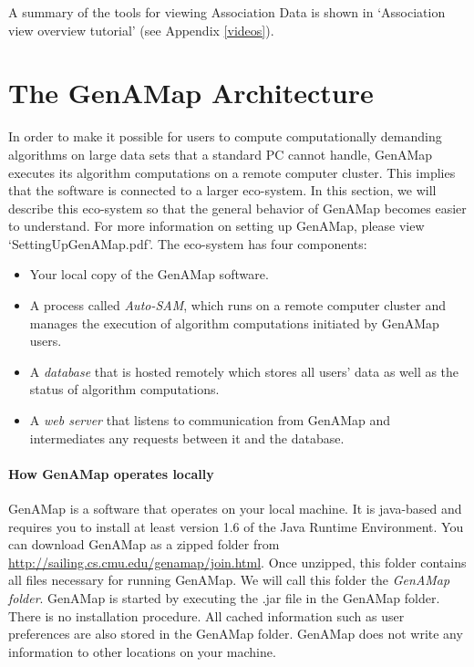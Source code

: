 \documentclass{article}
\begin{document}
A summary of the tools for viewing Association Data is shown in `Association view overview tutorial' (see Appendix \ref{videos}).






\section{The GenAMap Architecture} \label{architecture}

In order to make it possible for users to compute computationally demanding algorithms on large data sets that a standard PC cannot handle, GenAMap executes its algorithm computations on a remote computer cluster. This implies that the software is connected to a larger eco-system. In this section, we will describe this eco-system so that the general behavior of GenAMap becomes easier to understand. For more information on setting up GenAMap, please view `SettingUpGenAMap.pdf'. The eco-system has four components: 

\begin{itemize}
\item Your local copy of the GenAMap software. 
\item A process called {\it Auto-SAM}, which runs on a remote computer cluster and manages the execution of algorithm computations initiated by GenAMap users.
\item A {\it database} that is hosted remotely which stores all users' data as well as the status of algorithm computations.
\item A {\it web server} that listens to communication from GenAMap and intermediates any requests between it and the database.
\end{itemize}

\paragraph{How GenAMap operates locally} GenAMap is a software that operates on your local machine. It is java-based and requires you to install at least version 1.6 of the Java Runtime Environment. You can download GenAMap as a zipped folder from \url{http://sailing.cs.cmu.edu/genamap/join.html}. Once unzipped, this folder contains all files necessary for running GenAMap. We will call this folder the {\it GenAMap folder}. GenAMap is started by executing the .jar file in the GenAMap folder. There is no installation procedure. All cached information such as user preferences are also stored in the GenAMap folder. GenAMap does not write any information to other locations on your machine. \\
\end{document}
